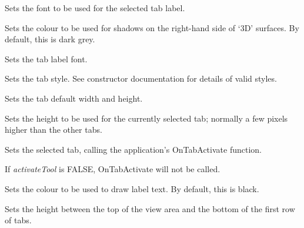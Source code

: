 Sets the font to be used for the selected tab label.



Sets the colour to be used for shadows on the right-hand side of `3D' surfaces. By default, this is dark grey.



Sets the tab label font.



Sets the tab style. See constructor documentation for details of valid styles.



Sets the tab default width and height.



Sets the height to be used for the currently selected tab; normally a few pixels
higher than the other tabs.



Sets the selected tab, calling the application's OnTabActivate function.

If {\it activateTool} is FALSE, OnTabActivate will not be called.



Sets the colour to be used to draw label text. By default, this is
black.



Sets the height between the top of the view area and the bottom of the first
row of tabs.


